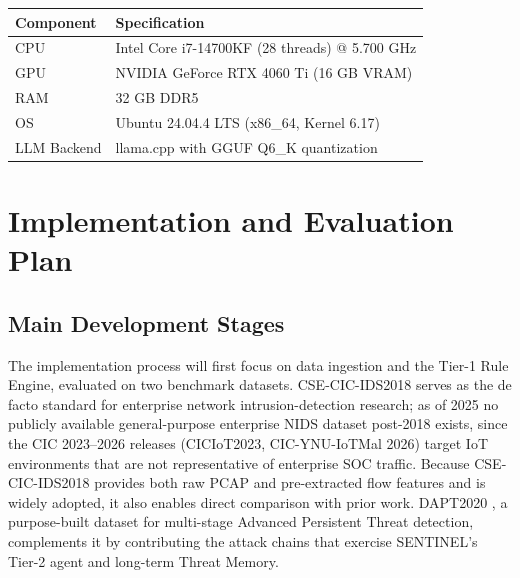 \documentclass[12pt,a4paper]{article}
\begin{document}
\begin{table}[H]
    \centering
    \begin{tabular}{ll}
        \toprule
        \textbf{Component} & \textbf{Specification}                         \\
        \midrule
        CPU                & Intel Core i7-14700KF (28 threads) @ 5.700 GHz \\
        GPU                & NVIDIA GeForce RTX 4060 Ti (16 GB VRAM)        \\
        RAM                & 32 GB DDR5                                     \\
        OS                 & Ubuntu 24.04.4 LTS (x86\_64, Kernel 6.17)      \\
        LLM Backend        & llama.cpp with GGUF Q6\_K quantization          \\
        \bottomrule
    \end{tabular}
\end{table}

\newpage
\section{Implementation and Evaluation Plan}

\subsection{Main Development Stages}
The implementation process will first focus on data ingestion and the Tier-1 Rule Engine, evaluated on two benchmark datasets. CSE-CIC-IDS2018 \cite{sharafaldin2018} serves as the de facto standard for enterprise network intrusion-detection research; as of 2025 no publicly available general-purpose enterprise NIDS dataset post-2018 exists, since the CIC 2023--2026 releases (CICIoT2023, CIC-YNU-IoTMal 2026) target IoT environments that are not representative of enterprise SOC traffic. Because CSE-CIC-IDS2018 provides both raw PCAP and pre-extracted flow features and is widely adopted, it also enables direct comparison with prior work. DAPT2020 \cite{dapt2020}, a purpose-built dataset for multi-stage Advanced Persistent Threat detection, complements it by contributing the attack chains that exercise SENTINEL's Tier-2 agent and long-term Threat Memory.
\end{document}

